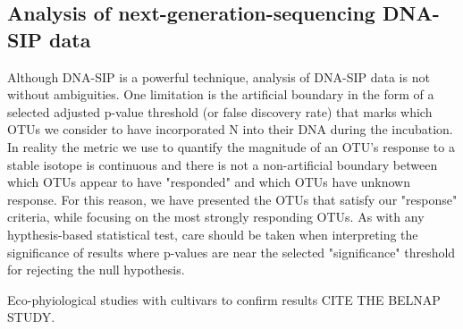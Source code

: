 \subsection{Analysis of next-generation-sequencing DNA-SIP data}
Although DNA-SIP is a powerful technique, analysis of DNA-SIP data is not without ambiguities. One limitation is the artificial boundary in the form of a selected adjusted p-value threshold (or false discovery rate) that marks which OTUs we consider to have incorporated N into their DNA during the incubation. In reality the metric we use to quantify the magnitude of an OTU's response to a stable isotope is continuous and there is not a non-artificial boundary between which OTUs appear to have "responded" and which OTUs have unknown response. For this reason, we have presented the OTUs that satisfy our "response" criteria, while focusing on the most strongly responding OTUs. As with any hypthesis-based statistical test, care should be taken when interpreting the significance of results where p-values are near the selected "significance" threshold for rejecting the null hypothesis.

Eco-phyiological studies with cultivars to confirm results CITE THE BELNAP STUDY.

